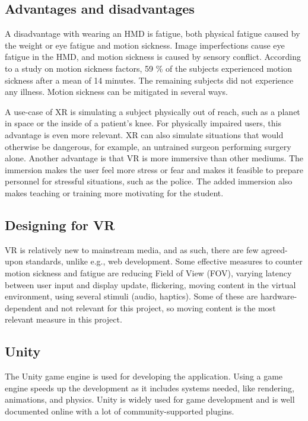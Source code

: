 \documentclass[a4paper]{report}
\begin{document}

\subsection{Advantages and disadvantages}
A disadvantage with wearing an HMD is fatigue, both physical fatigue caused by the weight or eye fatigue and motion sickness\cite{merhi_motion_2007}.
Image imperfections cause eye fatigue in the HMD\cite{kooi_visual_2004}, and motion sickness is caused by sensory conflict.
According to a study on motion sickness factors, 59 \% of the subjects experienced motion sickness after a mean of 14 minutes. The remaining subjects did not experience any illness\cite{kooi_visual_2004}. Motion sickness can be mitigated in several ways.


A use-case of XR is simulating a subject physically out of reach, such as a planet in space or the inside of a patient's knee. For physically impaired users, this advantage is even more relevant.
XR can also simulate situations that would otherwise be dangerous, for example, an untrained surgeon performing surgery alone.
Another advantage is that VR is more immersive than other mediums. The immersion makes the user feel more stress or fear and makes it feasible to prepare personnel for stressful situations, such as the police.
The added immersion also makes teaching or training more motivating for the student.\cite{freina_immersive_2015}


\subsection{Designing for VR}
VR is relatively new to mainstream media, and as such, there are few agreed-upon standards, unlike e.g., web development.
Some effective measures to counter motion sickness and fatigue are reducing Field of View (FOV), varying latency between user input and display update, flickering, moving content in the virtual environment, using several stimuli (audio, haptics)\cite{chang_virtual_2020}. Some of these are hardware-dependent and not relevant for this project, so moving content is the most relevant measure in this project.

\subsection{Unity}

The Unity game engine is used for developing the application\cite{technologies_unity_nodate}. Using a game engine speeds up the development as it includes systems needed, like rendering, animations, and physics. Unity is widely used for game development\cite{doucet_game_2021} and is well documented online with a lot of community-supported plugins.
\end{document}
